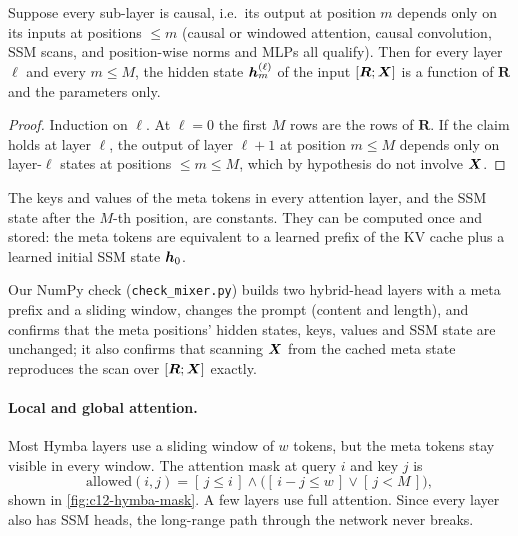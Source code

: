 \begin{proposition}\label{prop:c12-meta}
Suppose every sub-layer is causal, i.e.\ its output at position $m$ depends only on its inputs at
positions $\le m$ (causal or windowed attention, causal convolution, SSM scans, and position-wise
norms and MLPs all qualify). Then for every layer $\ell$ and every $m\le M$, the hidden state
$\bm{h}^{(\ell)}_m$ of the input $[\bm{R};\bm{X}]$ is a function of $\bm{R}$ and the parameters only.
\end{proposition}
\begin{proof}
Induction on $\ell$. At $\ell = 0$ the first $M$ rows are the rows of $\bm{R}$. If the claim holds at
layer $\ell$, the output of layer $\ell+1$ at position $m\le M$ depends only on layer-$\ell$
states at positions $\le m\le M$, which by hypothesis do not involve $\bm{X}$.
\end{proof}

\begin{corollary}\label{cor:c12-meta}
The keys and values of the meta tokens in every attention layer, and the SSM state after the
$M$-th position, are constants. They can be computed once and stored: the meta tokens are
equivalent to a learned prefix of the KV cache plus a learned initial SSM state $\bm{h}_0$.
\end{corollary}

Our NumPy check (\texttt{check\_mixer.py}) builds two hybrid-head layers with a meta prefix and a
sliding window, changes the prompt (content and length), and confirms that the meta positions'
hidden states, keys, values and SSM state are unchanged; it also confirms that scanning $\bm{X}$ from
the cached meta state reproduces the scan over $[\bm{R};\bm{X}]$ exactly.

\paragraph{Local and global attention.} Most Hymba layers use a sliding window of $w$ tokens, but
the meta tokens stay visible in every window. The attention mask at query $i$ and key $j$ is
\begin{equation}\label{eq:c12-hymba-mask}
  \mathrm{allowed}(i,j) = [\,j\le i\,]\wedge\big([\,i-j\le w\,]\vee[\,j<M\,]\big),
\end{equation}
shown in \cref{fig:c12-hymba-mask}. A few layers use full attention. Since every layer also has
SSM heads, the long-range path through the network never breaks.


